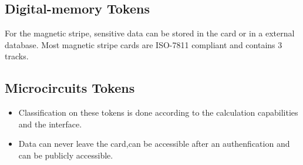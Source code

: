 \subsection{Digital-memory Tokens}

    For the magnetic stripe, sensitive data can be stored in the
    card or in a external database. Most magnetic stripe cards
    are \textsc{ISO-7811} compliant and contains 3 tracks.

\subsection{Microcircuits Tokens}

\begin{itemize}
    \item Classification on these tokens is done according to the
        calculation capabilities and the interface.
    \item Data can never leave the card,can be accessible after an
    authenfication and can be publicly accessible.
\end{itemize}



